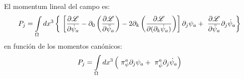 \documentclass[a4paper,12pt]{article}
\begin{document}
El momentum lineal del campo es:
\begin{equation}
P_{j}=\int\limits_{\Omega}dx^{3}\left\{ \ \left[\frac{\partial \mathscr{L} }{\partial\dot\psi_a}-\partial_{0}\left(\frac{\partial\mathscr{L} }{\partial\ddot\psi_a}  \right)-2\partial_{k}\left(\frac{\partial\mathscr{L} }{\partial(\partial_{k}\dot\psi_a)}  \right) \right]\partial_j\psi_a +\ \frac{\partial\mathscr{L} }{\partial\ddot\psi_a}\partial_j\dot\psi_a\ \\ \right\}
\end{equation}
en función de los momentos canónicos:
\begin{equation}
P_{j}=\int\limits_{\Omega}dx^{3}\left( \ \pi^{a}_{\psi}\partial_j\psi_a +\ \pi^{a}_{\dot\psi}\partial_j\dot\psi_a\ \\ \right)
\end{equation}
\vspace{0,4cm}

\\
\end{document}
